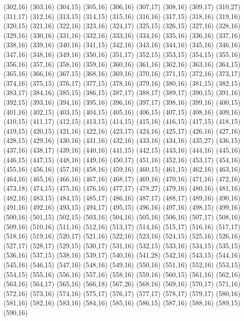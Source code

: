 (302,16)
(303,16)
(304,15)
(305,16)
(306,16)
(307,17)
(308,16)
(309,17)
(310,27)
(311,17)
(312,16)
(313,15)
(314,15)
(315,16)
(316,16)
(317,15)
(318,16)
(319,16)
(320,15)
(321,16)
(322,16)
(323,16)
(324,17)
(325,15)
(326,15)
(327,16)
(328,16)
(329,16)
(330,16)
(331,16)
(332,16)
(333,16)
(334,16)
(335,16)
(336,16)
(337,16)
(338,16)
(339,16)
(340,16)
(341,15)
(342,16)
(343,16)
(344,16)
(345,16)
(346,16)
(347,16)
(348,16)
(349,16)
(350,16)
(351,17)
(352,15)
(353,15)
(354,15)
(355,16)
(356,16)
(357,16)
(358,16)
(359,16)
(360,16)
(361,16)
(362,16)
(363,16)
(364,15)
(365,16)
(366,16)
(367,15)
(368,16)
(369,16)
(370,16)
(371,15)
(372,16)
(373,17)
(374,16)
(375,15)
(376,17)
(377,15)
(378,16)
(379,16)
(380,16)
(381,15)
(382,15)
(383,17)
(384,16)
(385,15)
(386,15)
(387,17)
(388,17)
(389,17)
(390,15)
(391,16)
(392,15)
(393,16)
(394,16)
(395,16)
(396,16)
(397,17)
(398,16)
(399,16)
(400,15)
(401,16)
(402,15)
(403,15)
(404,15)
(405,16)
(406,15)
(407,15)
(408,16)
(409,16)
(410,15)
(411,17)
(412,15)
(413,15)
(414,15)
(415,16)
(416,15)
(417,15)
(418,15)
(419,15)
(420,15)
(421,16)
(422,16)
(423,17)
(424,16)
(425,17)
(426,16)
(427,16)
(428,15)
(429,16)
(430,16)
(431,16)
(432,16)
(433,16)
(434,16)
(435,27)
(436,15)
(437,16)
(438,17)
(439,16)
(440,16)
(441,15)
(442,15)
(443,16)
(444,16)
(445,16)
(446,15)
(447,15)
(448,16)
(449,16)
(450,17)
(451,16)
(452,16)
(453,17)
(454,16)
(455,16)
(456,16)
(457,16)
(458,16)
(459,16)
(460,15)
(461,15)
(462,16)
(463,16)
(464,16)
(465,16)
(466,16)
(467,16)
(468,17)
(469,16)
(470,16)
(471,16)
(472,16)
(473,18)
(474,15)
(475,16)
(476,16)
(477,17)
(478,27)
(479,16)
(480,16)
(481,16)
(482,16)
(483,15)
(484,15)
(485,17)
(486,16)
(487,17)
(488,17)
(489,16)
(490,16)
(491,16)
(492,16)
(493,15)
(494,17)
(495,15)
(496,16)
(497,16)
(498,15)
(499,16)
(500,16)
(501,15)
(502,15)
(503,16)
(504,16)
(505,16)
(506,16)
(507,17)
(508,16)
(509,16)
(510,16)
(511,16)
(512,16)
(513,17)
(514,16)
(515,17)
(516,16)
(517,17)
(518,16)
(519,16)
(520,17)
(521,16)
(522,16)
(523,16)
(524,15)
(525,16)
(526,16)
(527,17)
(528,17)
(529,15)
(530,17)
(531,16)
(532,15)
(533,16)
(534,15)
(535,15)
(536,16)
(537,15)
(538,16)
(539,17)
(540,16)
(541,28)
(542,16)
(543,15)
(544,16)
(545,16)
(546,15)
(547,16)
(548,16)
(549,16)
(550,16)
(551,16)
(552,16)
(553,15)
(554,15)
(555,16)
(556,16)
(557,16)
(558,16)
(559,16)
(560,15)
(561,16)
(562,16)
(563,16)
(564,17)
(565,16)
(566,18)
(567,26)
(568,16)
(569,16)
(570,17)
(571,16)
(572,16)
(573,16)
(574,16)
(575,17)
(576,17)
(577,17)
(578,17)
(579,17)
(580,16)
(581,16)
(582,16)
(583,16)
(584,16)
(585,16)
(586,15)
(587,16)
(588,16)
(589,15)
(590,16)
